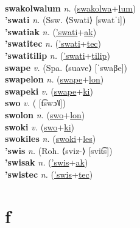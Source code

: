  \label{swakolwa} \\
\textbf{swakolwalum} \textit{n.} (\hyperref[swakolwa]{swakolwa}+\hyperref[lum]{lum})
 \label{swakolwalum} \\
\textbf{'swati} \textit{n.} (Ssw. ⟨Swati⟩ [swatˈi])
 \label{'swati} \\
\textbf{'swatiak} \textit{n.} (\hyperref['swati]{'swati}+\hyperref[ak]{ak})
 \label{'swatiak} \\
\textbf{'swatitec} \textit{n.} (\hyperref['swati]{'swati}+\hyperref[tec]{tec})
 \label{'swatitec} \\
\textbf{'swatitilip} \textit{n.} (\hyperref['swati]{'swati}+\hyperref[tilip]{tilip})
 \label{'swatitilip} \\
\textbf{swape} \textit{v.} (Spa. ⟨suave⟩ [ˈswaβe])
 \label{swape} \\
\textbf{swapelon} \textit{n.} (\hyperref[swape]{swape}+\hyperref[lon]{lon})
 \label{swapelon} \\
\textbf{swapeki} \textit{v.} (\hyperref[swape]{swape}+\hyperref[ki]{ki})
 \label{swapeki} \\
\textbf{swo} \textit{v.} ( [t͡swɔ˥˩])
 \label{swo} \\
\textbf{swolon} \textit{n.} (\hyperref[swo]{swo}+\hyperref[lon]{lon})
 \label{swolon} \\
\textbf{swoki} \textit{v.} (\hyperref[swo]{swo}+\hyperref[ki]{ki})
 \label{swoki} \\
\textbf{swokiles} \textit{n.} (\hyperref[swoki]{swoki}+\hyperref[les]{les})
 \label{swokiles} \\
\textbf{'swis} \textit{n.} (Roh. ⟨sviz-⟩ [svit͡s])
 \label{'swis} \\
\textbf{'swisak} \textit{n.} (\hyperref['swis]{'swis}+\hyperref[ak]{ak})
 \label{'swisak} \\
\textbf{'swistec} \textit{n.} (\hyperref['swis]{'swis}+\hyperref[tec]{tec})
 \label{'swistec} 

\section{f}

